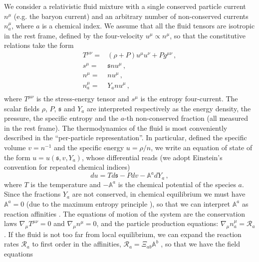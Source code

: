 \documentclass[a4paper, amsfonts, amssymb, amsmath, reprint, showkeys, nofootinbib, twoside, onecolumn,notitlepage]{revtex4-1}
\begin{document}
We consider a relativistic fluid mixture \cite{noto_rel} with a single conserved particle current $n^\mu$ (e.g. the baryon current) and an arbitrary number of non-conserved currents $n_a^\mu$, where $a$ is a chemical index. We assume that all the fluid tensors are isotropic in the rest frame, defined by the four-velocity $u^\mu \propto n^\mu$, so that the constitutive relations take the form \cite{MTW_book,noto_rel,Gourgoulhon2006,Landry2020}
\begin{equation}\label{tmunu}
\begin{split}
T^{\mu \nu} ={}& (\rho+P)u^\mu u^\nu + P g^{\mu \nu} \, , \\
s^\mu ={}& \mathfrak{s} n u^\mu \, , \\
n^\mu ={}& n u^\mu \, , \\
n_a^\mu ={}& Y_a n  u^\mu \, , \\
\end{split}
\end{equation}
where $T^{\mu \nu}$ is the stress-energy tensor and $s^\mu$ is the entropy four-current. The scalar fields $\rho$, $P$, $\mathfrak{s}$ and $Y_a$ are interpreted respectively as the energy density, the pressure, the specific entropy and the $a$-th non-conserved fraction (all measured in the rest frame). The thermodynamics of the fluid is most conveniently described in the ``per-particle representation''. In particular, defined the specific volume $v=n^{-1}$ and the specific energy $u=\rho/n$, we write an equation of state of the form $u=u(\mathfrak{s},v,Y_a)$, whose differential reads \cite{Callen_book} (we adopt Einstein's convention for repeated chemical indices)
\begin{equation}\label{duuu}
du = Td \mathfrak{s}-Pdv -\mathbb{A}^a dY_a \, ,
\end{equation} 
where $T$ is the temperature and $-\mathbb{A}^a$ is the chemical potential of the species $a$. Since the fractions $Y_a$ are not conserved, in chemical equilibrium we must have $\mathbb{A}^a=0$ (due to the maximum entropy principle \cite{landau5,Callen_book,GavassinoGibbs2021}), so that we can interpret $\mathbb{A}^a$ as reaction affinities \cite{PrigoginebookModernThermodynamics2014,peliti_book}. The equations of motion of the system are the conservation laws $\nabla_\mu T^{\mu \nu}=0$ and $\nabla_\mu n^\mu=0$, and the particle production equations: $\nabla_\mu n^\mu_a =\mathcal{R}_a$. If the fluid is not too far from local equilibrium, we can expand the reaction rates $\mathcal{R}_a$ to first order in the affinities, $\mathcal{R}_a=\Xi_{ab}\mathbb{A}^b$ \cite{carter1991,Termo}, so that we have the field equations
\end{document}
